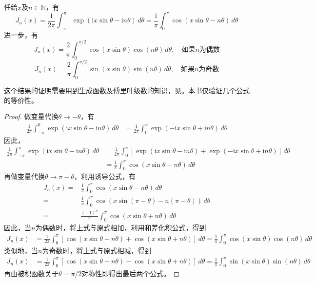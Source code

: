 \begin{proposition}[贝塞尔积分公式]
    任给$x$及$n\in\mathbb{N}$，有
    \[J_n(x)=\frac{1}{2\pi}\int_{-\pi}^{\pi}\exp(\mathrm{i}x\sin\theta - \mathrm{i}n\theta)\,d\theta=\frac{1}{\pi}\int_{0}^{\pi}\cos(x\sin\theta - n\theta)\,d\theta\]
    进一步，有
    \[J_n(x)=\frac{2}{\pi}\int_{0}^{\pi/2}\cos(x\sin\theta)\cos(n\theta)\,d\theta,\quad \text{如果}n\text{为偶数}\]
    \[J_n(x)=\frac{2}{\pi}\int_{0}^{\pi/2}\sin(x\sin\theta)\sin(n\theta)\,d\theta,\quad\text{如果}n\text{为奇数}\]
\end{proposition}
这个结果的证明需要用到生成函数及傅里叶级数的知识，见\cite{folland}。本书仅验证几个公式的等价性。
\begin{proof}
    做变量代换$\theta\to -\theta$，有
    \begin{align*}
        \frac{1}{2\pi}\int_{-\pi}^{0}\exp(\mathrm{i}x\sin\theta - \mathrm{i}n\theta)\,d\theta&=\frac{1}{2\pi}\int_{0}^{\pi}\exp(-\mathrm{i}x\sin\theta + \mathrm{i}n\theta)\,d\theta
    \end{align*}
    因此，
    \begin{align*}
        \frac{1}{2\pi}\int_{-\pi}^{\pi}\exp(\mathrm{i}x\sin\theta - \mathrm{i}n\theta)\,d\theta&=\frac{1}{2\pi}\int_{0}^{\pi}[\exp(\mathrm{i}x\sin\theta - \mathrm{i}n\theta)+\exp(-\mathrm{i}x\sin\theta + \mathrm{i}n\theta)]\,d\theta\\
                                                                                     &=\frac{1}{\pi}\int_{0}^{\pi}\cos(x\sin\theta - n\theta)\,d\theta
    \end{align*}
    再做变量代换$\theta\to \pi-\theta$，利用诱导公式，有
    \begin{align*}
        J_n(x)=&\frac{1}{\pi}\int_{0}^{\pi}\cos(x\sin\theta - n\theta)\,d\theta\\
        =&\frac{1}{\pi}\int_{0}^{\pi}\cos(x\sin(\pi-\theta) - n(\pi-\theta))\,d\theta\\
        =&\frac{(-1)^n}{\pi}\int_{0}^{\pi}\cos(x\sin\theta + n\theta)\,d\theta
    \end{align*}
    因此，当$n$为偶数时，将上式与原式相加，利用和差化积公式，得到
    \begin{align*}
        J_n(x)&=\frac{1}{2\pi}\int_{0}^{\pi}[\cos(x\sin\theta - n\theta)+\cos(x\sin\theta + n\theta)]\,d\theta=\frac{1}{\pi}\int_{0}^{\pi}\cos(x\sin\theta)\cos(n\theta)\,d\theta
    \end{align*}
    类似地，当$n$为奇数时，将上式与原式相减，得到
    \begin{align*}
        J_n(x)&=\frac{1}{2\pi}\int_{0}^{\pi}[\cos(x\sin\theta - n\theta)-\cos(x\sin\theta + n\theta)]\,d\theta=\frac{1}{\pi}\int_{0}^{\pi}\sin(x\sin\theta)\sin(n\theta)\,d\theta
    \end{align*}
    再由被积函数关于$\theta=\pi/2$对称性即得出最后两个公式。
\end{proof}
